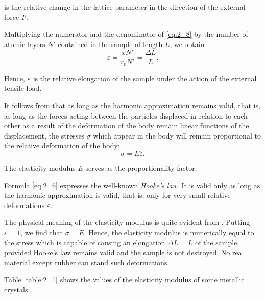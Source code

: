 \noindent
is the relative change in the lattice parameter in the direction of the external force $F$.

Multiplying the numerator and the denominator of \eqref{eq:2_8} by the number of atomic layers $N'$ contained in the sample of length $L$, we obtain
\begin{equation}\label{eq:2_9}
	\varepsilon = \frac{x N'}{r_0 N'} = \frac{\Delta{L}}{L}.
\end{equation}

\noindent
Hence, $\varepsilon$ is the relative elongation of the sample under the action of the external tensile load.

It follows from  that as long as the harmonic approximation remains valid, that is, as long as the forces acting between the particles displaced in relation to each other as a result of the deformation of the body remain linear functions of the displacement, the stresses $\sigma$ which appear in the body will remain proportional to the relative deformation of the body:
\begin{equation*}
	\sigma = E \varepsilon.
\end{equation*}

\noindent
The elasticity modulus $E$ serves as the proportionality factor.

Formula \eqref{eq:2_6} expresses the well-known \textit{Hooke's law}. It is valid only as long as the harmonic approximation is valid, that is, only for very small relative deformations $\varepsilon$.

The physical meaning of the elasticity modulus is quite evident from . Putting $\varepsilon=1$, we find that $\sigma=E$. Hence, the elasticity modulus is numerically equal to the stress which is capable of causing an elongation $\Delta{L}=L$ of the sample, provided Hooke's law remains valid and the sample is not destroyed. No real material except rubber can stand such deformations.

Table \ref{table:2_1} shows the values of the elasticity modulus of some metallic crystals.

